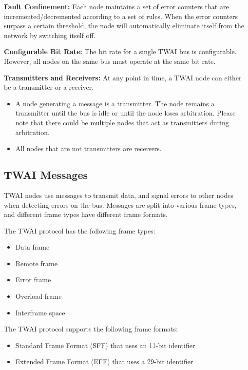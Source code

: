 \documentclass[main\_\_EN.tex]{subfiles}
\begin{document}
{\bfseries Fault Confinement:} Each node maintains a set of error counters that are incremented/decremented according to a set of rules. When the error counters surpass a certain threshold, the node will automatically eliminate itself from the network by switching itself off.

{\bfseries
Configurable Bit Rate:} The bit rate for a single TWAI bus is configurable. However, all nodes on the same bus must operate at the same bit rate.

{\bfseries Transmitters and Receivers:} At any point in time, a TWAI node can either be a transmitter or a receiver.
\begin{itemize}
    \item A node generating a message is a transmitter. The node remains a transmitter until the bus is idle or until the node loses arbitration. Please note that there could be multiple nodes that act as transmitters during arbitration.
    \item All nodes that are not transmitters are receivers.
\end{itemize}

\subsection{TWAI Messages}
\label{sec:twai-messages}

TWAI nodes use messages to transmit data, and signal errors to other nodes when detecting errors on the bus. Messages are split into various frame types, and different frame types have different frame formats.

The TWAI protocol has the following frame types:

\begin{itemize}
    \item Data frame
    \item Remote frame
    \item Error frame
    \item Overload frame
    \item Interframe space
\end{itemize}

The TWAI protocol supports the following frame formats:

\begin{itemize}
    \item Standard Frame Format (SFF) that uses an 11-bit identifier
    \item Extended Frame Format (EFF) that uses a 29-bit identifier
\end{itemize}
\end{document}
